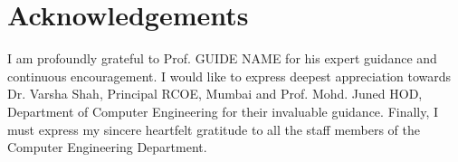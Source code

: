 \chapter*{Acknowledgements}
I am profoundly grateful to Prof. GUIDE NAME for his expert guidance and continuous encouragement.  
I would like to express deepest appreciation towards Dr. Varsha Shah, Principal RCOE, Mumbai and Prof. Mohd. Juned HOD, Department of Computer Engineering for their invaluable guidance.  
Finally, I must express my sincere heartfelt gratitude to all the staff members of the Computer Engineering Department.
